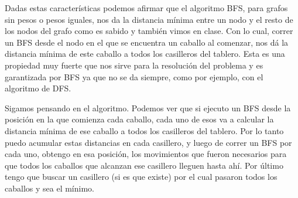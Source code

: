 Dadas estas caracter\'isticas podemos afirmar que el algoritmo BFS, para grafos sin pesos o pesos iguales, nos da la distancia m\'inima entre un nodo y el resto de los nodos del grafo como es sabido y tambi\'en vimos en clase. Con lo cual, correr un BFS desde el nodo en el que se encuentra un caballo al comenzar, nos d\'a la distancia m\'inima de este caballo a todos los casilleros del tablero. Esta es una propiedad muy fuerte que nos sirve para la resoluci\'on del problema y es garantizada por BFS ya que no se da siempre, como por ejemplo, con el algoritmo de DFS.

Sigamos pensando en el algoritmo. Podemos ver que si ejecuto un BFS desde la posici\'on en la que comienza cada caballo, cada uno de esos va a calcular la distancia m\'inima de ese caballo a todos los casilleros del tablero. Por lo tanto puedo acumular estas distancias en cada casillero, y luego de correr un BFS por cada uno, obtengo en esa posici\'on, los movimientos que fueron necesarios para que todos los caballos que alcanzan ese casillero lleguen hasta ah\'i. Por \'ultimo tengo que buscar un casillero (si es que existe) por el cual pasaron todos los caballos y sea el m\'inimo.